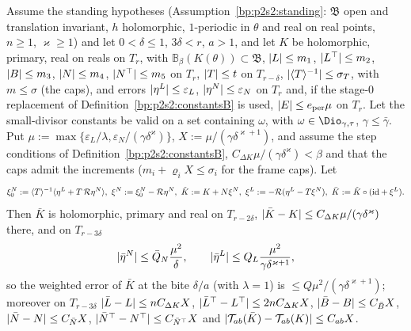 \begin{proposition}\label{bp:p2s2:step}
Assume the standing hypotheses (Assumption~\ref{bp:p2s2:standing}: $\mathfrak B$ open and translation invariant, $h$ holomorphic, $1$-periodic
in $\theta$ and real on real points, $n\ge1$, $\varkappa\ge1$) and let $0<\delta\le1$, $3\delta<r$, $a>1$, and let $K$ be holomorphic, primary, real on
reals on $T_r$, with $\mathbb B_\beta(K(\theta))\subset\mathfrak B$, $\lvert L\rvert\le m_1$, $\lvert L^\top\rvert\le m_2$, $\lvert B\rvert\le m_3$, $\lvert N\rvert\le m_4$, $\lvert N^\top\rvert\le m_5$ on
$T_r$, $\lvert T\rvert\le t$ on $T_{r-\delta}$, $\lvert \langle T\rangle^{-1}\rvert\le\sigma_T$, with $m\le\sigma$ (the caps), and errors $\lvert \eta^L\rvert\le\varepsilon_L$,
$\lvert \eta^N\rvert\le\varepsilon_N$ on $T_r$ and, if the stage-$0$ replacement of Definition~\ref{bp:p2s2:constantsB} is used, $\lvert E\rvert\le e_{\mathrm{per}}\mu$ on $T_r$. Let
the small-divisor constants be valid on a set containing $\omega$, with $\omega\in\Dio_{\gamma,\tau}$,
$\gamma\le\bar\gamma$. Put $\mu:=\max\{\varepsilon_L/\lambda,\varepsilon_N/(\gamma\delta^\varkappa)\}$, $X:=\mu/(\gamma\delta^{\varkappa+1})$, and assume the step conditions of
Definition~\ref{bp:p2s2:constantsB}, $C_{\Delta K}\mu/(\gamma\delta^\varkappa)<\beta$ and that the caps admit the increments ($m_i+\varrho_iX\le\sigma_i$ for the
frame caps). Let
\[
\xi^N_0:=\langle T\rangle^{-1}\langle \eta^L+T\,\mathcal R\eta^N\rangle,\ \xi^N:=\xi^N_0-\mathcal R\eta^N,\ \tilde K:=K+N\xi^N,\ \xi^L:=-\mathcal R(\eta^L-T\xi^N),\ \bar K:=\tilde K\circ(\mathrm{id}+\xi^L).
\]
Then $\bar K$ is holomorphic, primary and real on $T_{r-2\delta}$, $\lvert \bar K-K\rvert\le C_{\Delta K}\mu/(\gamma\delta^\varkappa)$ there, and on $T_{r-3\delta}$
\[
\lvert \bar\eta^N\rvert\le\bar Q_N\frac{\mu^2}\delta,\qquad\lvert \bar\eta^L\rvert\le Q_L\frac{\mu^2}{\gamma\delta^{\varkappa+1}},
\]
so the weighted error of $\bar K$ at the bite $\delta/a$ (with $\lambda=1$) is $\le Q\mu^2/(\gamma\delta^{\varkappa+1})$; moreover on $T_{r-3\delta}$
$\lvert \bar L-L\rvert\le nC_{\Delta K}X$, $\lvert \bar L^\top-L^\top\rvert\le2nC_{\Delta K}X$, $\lvert \bar B-B\rvert\le C_{\bar B}X$, $\lvert \bar N-N\rvert\le C_{\bar N}X$, $\lvert \bar N^\top-N^\top\rvert\le C_{\bar N^\top}X$
and $\lvert \mathcal T_{ab}(\bar K)-\mathcal T_{ab}(K)\rvert\le C_{ab}X$.
\end{proposition}

